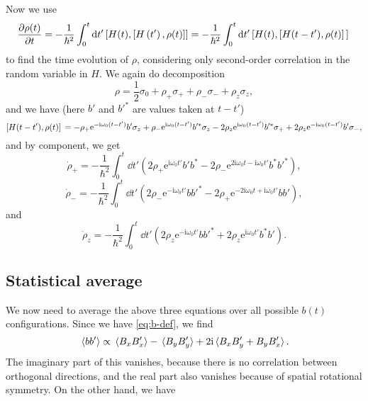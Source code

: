 \documentclass[hyperref, a4paper]{article}
\newcommand*{\ii}{\mathrm{i}}
\newcommand*{\ee}{\mathrm{e}}
\begin{document}
Now we use 
\begin{equation}
    \frac{\partial \rho(t)}{\partial t}=-\frac{1}{\hbar^2} \int_0^t \dd t^{\prime}\left[H(t),\left[H\left(t^{\prime}\right), \rho(t)\right]\right] 
    = - \frac{1}{\hbar^2} \int_{0}^t \dd{t'} \comm*{H(t)}{\comm*{H(t - t')}{\rho(t)}}
\end{equation}
to find the time evolution of $\rho$, 
considering only second-order correlation 
in the random variable in $H$.
We again do decomposition
\begin{equation}
    \rho = \frac{1}{2} \sigma_0 + \rho_+ \sigma_+ + \rho_- \sigma_- + \rho_z \sigma_z,
\end{equation}
and we have (here $b'$ and $b'^*$ are values taken at $t - t'$)
\[
    \comm*{H(t - t')}{\rho(t)}
    = - \rho_+ \ee^{- \ii \omega_0 (t - t')} b' \sigma_z 
    + \rho_- \ee^{\ii \omega_0 (t - t')} b'^* \sigma_z 
    - 2 \rho_z \ee^{\ii \omega_0 (t - t')} b'^* \sigma_+ 
    + 2 \rho_z \ee^{- \ii \omega_0 (t - t')} b' \sigma_-,
\]
and by component, we get 
\begin{equation}
    \dot{\rho}_{+} = - \frac{1}{\hbar^2} \int_{0}^{t} \dd{t'} \left(
        2 \rho_+ \ee^{\ii \omega_0 t'} b' b^* 
        - 2 \rho_- \ee^{2 \ii \omega_0 t - \ii \omega_0 t'} b^* b'^*
    \right),
\end{equation}
\begin{equation}
    \dot{\rho}_{-} = - \frac{1}{\hbar^2} \int_{0}^{t} \dd{t'} \left(
        2 \rho_- \ee^{- \ii \omega_0 t'} b b'^* 
        - 2 \rho_+ \ee^{- 2 \ii \omega_0 t + \ii \omega_0 t'} b b'
    \right),
\end{equation}
and 
\begin{equation}
    \dot{\rho}_z = - \frac{1}{\hbar^2} \int_{0}^{t} \dd{t'} \left(
        2 \rho_z \ee^{- \ii \omega_0 t'} b b'^* 
        + 2 \rho_z \ee^{\ii \omega_0 t'} b^* b'
    \right).
\end{equation}

\subsection{Statistical average}

We now need to average the above three equations 
over all possible $b(t)$ configurations. 
Since we have \eqref{eq:b-def},
we find 
\[
    \expval*{b b'} \propto \expval*{B_x B_x'} - \expval*{B_y B_y'} + 2 \ii \expval*{B_x B_y' + B_y B_x'}.
\]
The imaginary part of this vanishes, 
because there is no correlation between orthogonal directions, 
and the real part also vanishes 
because of spatial rotational symmetry.
On the other hand, we have 
\end{document}
